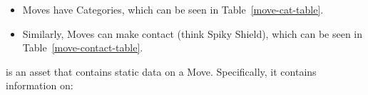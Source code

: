 

\begin{tldr}
	\begin{itemize}
		\item{Moves have Categories, which can be seen in Table~\ref{move-cat-table}.}
		\item{Similarly, Moves can make contact (think Spiky Shield), which can be seen in Table~\ref{move-contact-table}.}
	\end{itemize}
\end{tldr}

\localtoc



 is an asset that contains static data on a Move. Specifically, it contains information on:\\

\newcommand{\bitem}[2]{\item{\textbf{#1}. #2}}

